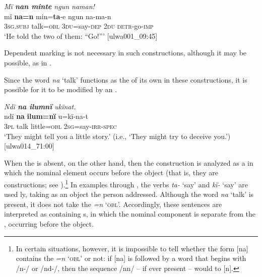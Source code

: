 \ea%
    \label{ex:syntax:199}
          \textit{Mï \textbf{nan minte} ngun naman!}\\
\gll mï      \textbf{na=n}    min=\textbf{ta}{}-e    ngun  na-ma-n\\
    3\textsc{sg.subj}  talk=\textsc{obl}  3\textsc{du}=say-\textsc{dep}  \textsc{2du}  \textsc{detr-}go-\textsc{imp}\\
\glt `He told the two of them: “Go!”’ [ulwa001\_09:45]
\z

Dependent marking  is not necessary in such  constructions, although it may be possible, as in .

  Since the word \textit{na} ‘talk’ functions as the  of its own   in these constructions, it is possible for it to be modified by an  .



\ea%
    \label{ex:syntax:200}
          \textit{Ndï \textbf{na ilumnï} ukïnat.}\\
\gll    ndï  \textbf{na}    \textbf{ilum=nï}  u=kï-na-t\\
    3\textsc{pl}  talk  little=\textsc{obl}  \textsc{2sg}=say-\textsc{irr-spec}\\
\glt `They might tell you a little story.’ (i.e., ‘They might try to deceive you.’) [ulwa014\_71:00]
\z

  When the  is absent, on the other hand, then the construction is analyzed as a    in which the nominal element occurs before the object (that is, they are  constructions; see ).\footnote{In certain situations, however, it is impossible to tell whether the form [na] contains the  \textit{=n} ‘\textsc{obl}’ or not: if [na] is followed by a word that begins with /n-/ or /nd-/, then the sequence /nn/ -- if ever present -- would  to [n].} In examples  through , the verbs \textit{ta-} ‘say’ and \textit{kï-} ‘say’ are used ly, taking as an object the person addressed. Although the word \textit{na} ‘talk’ is present, it does not take the  \textit{=n} `\textsc{obl}’. Accordingly, these sentences are interpreted as containing  s, in which the nominal component is separate from the , occurring before the object.

